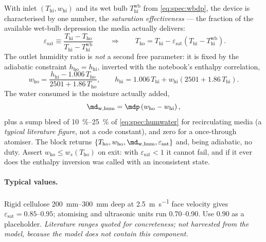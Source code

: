 With inlet $(T_{\mathrm{hi}}, w_{\mathrm{hi}})$ and its wet bulb $T_{\mathrm{hi}}^{\mathrm{wb}}$ from
\eqref{eq:spec:wbdp}, the device is characterised by one number, the \emph{saturation
effectiveness} --- the fraction of the available wet-bulb depression the media actually delivers:
\begin{equation}
\boxed{\;
\varepsilon_{\mathrm{sat}} \equiv
\frac{T_{\mathrm{hi}} - T_{\mathrm{ho}}}{T_{\mathrm{hi}} - T_{\mathrm{hi}}^{\mathrm{wb}}}
\;}
\qquad\Longrightarrow\qquad
T_{\mathrm{ho}} = T_{\mathrm{hi}} - \varepsilon_{\mathrm{sat}}
 \left(T_{\mathrm{hi}} - T_{\mathrm{hi}}^{\mathrm{wb}}\right) .
\label{eq:spec:epssat}
\end{equation}
The outlet humidity ratio is \emph{not} a second free parameter: it is fixed by the adiabatic
constraint $h_{\mathrm{ho}} = h_{\mathrm{hi}}$, inverted with the notebook's enthalpy correlation,
\begin{equation}
w_{\mathrm{ho}} = \frac{h_{\mathrm{hi}} - 1.006\,T_{\mathrm{ho}}}{2501 + 1.86\,T_{\mathrm{ho}}} ,
\qquad
h_{\mathrm{hi}} = 1.006\,T_{\mathrm{hi}} + w_{\mathrm{hi}}(2501 + 1.86\,T_{\mathrm{hi}}) .
\label{eq:spec:humw}
\end{equation}
The water consumed is the moisture actually added,
\begin{equation}
\md_{\mathrm{w,hum}} = \mdp\left(w_{\mathrm{ho}} - w_{\mathrm{hi}}\right) ,
\label{eq:spec:humwater}
\end{equation}
plus a sump bleed of \SIrange{10}{25}{\percent} of \eqref{eq:spec:humwater} for recirculating media
(a \emph{typical literature figure}, not a code constant), and zero for a once-through atomiser. The
block returns $\{T_{\mathrm{ho}}, w_{\mathrm{ho}}, \md_{\mathrm{w,hum}},
\varepsilon_{\mathrm{sat}}\}$ and, being adiabatic, no duty. Assert
$w_{\mathrm{ho}} \le w_{s}(T_{\mathrm{ho}})$ on exit: with $\varepsilon_{\mathrm{sat}}<1$ it cannot
fail, and if it ever does the enthalpy inversion was called with an inconsistent state.

\paragraph{Typical values.} Rigid cellulose \SIrange{200}{300}{\milli\metre} deep at
\SI{2.5}{\metre\per\second} face velocity gives $\varepsilon_{\mathrm{sat}} = \numrange{0.85}{0.95}$;
atomising and ultrasonic units run \numrange{0.70}{0.90}. Use $0.90$ as a placeholder.
\emph{Literature ranges quoted for concreteness; not harvested from the model, because the model does
not contain this component.}

